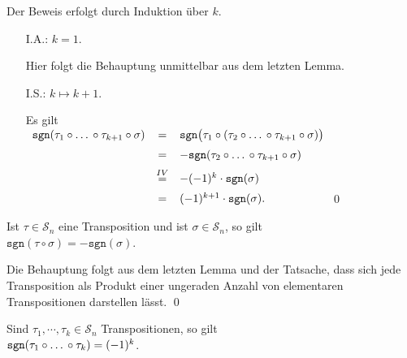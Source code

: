 \proof
Der Beweis erfolgt durch Induktion \"uber $k$.
\begin{enumerate}
\item[I.A.:] $k = 1$.  
  
             Hier folgt die Behauptung unmittelbar aus dem letzten Lemma.
\item[I.S.:] $k \mapsto k+1$.

             Es gilt
             \\[0.2cm]
             \hspace*{1.3cm}
             $
             \begin{array}[b]{lcl}
                 \mathtt{sgn}(\tau_1 \circ \mbox{\dots} \circ \tau_{k+1} \circ \sigma)
                 & = & \mathtt{sgn}\bigl(\tau_1 \circ (\tau_2 \circ \mbox{\dots} \circ \tau_{k+1} \circ \sigma)\bigr) \\[0.2cm]
                 & = & -\mathtt{sgn}(\tau_2 \circ \mbox{\dots} \circ \tau_{k+1} \circ \sigma) \\[0.2cm]
                 & \stackrel{IV}{=} & - (-1)^k \cdot \mathtt{sgn}(\sigma) \\[0.2cm]
                 & = & (-1)^{k+1} \cdot \mathtt{sgn}(\sigma).  
             \end{array}
             $\qed
\end{enumerate}

\begin{Korollar}
  Ist $\tau \in \mathcal{S}_n$ eine Transposition und ist $\sigma \in \mathcal{S}_n$, so gilt
  \\[0.2cm]
  \hspace*{1.3cm}
  $\mathtt{sgn}(\tau \circ \sigma) = -\mathtt{sgn}(\sigma)$.
\end{Korollar}

\proof
Die Behauptung folgt aus dem letzten Lemma und der Tatsache, dass sich jede Transposition als
Produkt einer ungeraden Anzahl von elementaren Transpositionen darstellen l\"asst.  \qed

\begin{Korollar}
  Sind $\tau_1, \cdots, \tau_k \in \mathcal{S}_n$ Transpositionen, so gilt 
  \\[0.2cm]
  \hspace*{1.3cm}
  $\mathtt{sgn}(\tau_1 \circ \mbox{\dots} \circ \tau_k) = (-1)^k$.
\end{Korollar}

